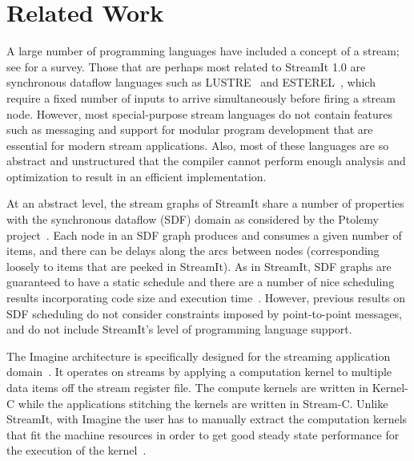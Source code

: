 \section{Related Work}
\label{sec:related}
A large number of programming languages have included a concept of a
stream; see \cite{survey97} for a survey.  Those that are perhaps most
related to StreamIt 1.0 are synchronous dataflow languages such as
LUSTRE~\cite{lustre} and ESTEREL~\cite{esterel92}, which require a fixed
number of inputs to arrive simultaneously before firing a stream node.
However, most special-purpose stream languages do not contain features
such as messaging and support for modular program development that are
essential for modern stream applications.  Also, most of these languages
are so abstract and unstructured that the compiler cannot perform enough
analysis and optimization to result in an efficient implementation.

At an abstract level, the stream graphs of StreamIt share a number of
properties with the synchronous dataflow (SDF) domain as considered by
the Ptolemy project~\cite{ptolemyoverview}.  Each node in an SDF graph
produces and consumes a given number of items, and there can be delays
along the arcs between nodes (corresponding loosely to items that are
peeked in StreamIt).  As in StreamIt, SDF graphs are guaranteed to
have a static schedule and there are a number of nice scheduling
results incorporating code size and execution time~\cite{leesdf}.
However, previous results on SDF scheduling do not consider
constraints imposed by point-to-point messages, and do not include
StreamIt's level of programming language support.

The Imagine architecture is specifically designed for the streaming
application domain~\cite{rixner98bandwidthefficient}.  It operates on
streams by applying a computation kernel to multiple data items off
the stream register file.  The compute kernels are written in Kernel-C
while the applications stitching the kernels are written in Stream-C.
Unlike StreamIt, with Imagine the user has to manually extract the
computation kernels that fit the machine resources in order to get
good steady state performance for the execution of the
kernel~\cite{kapasi:2001:ss}.

